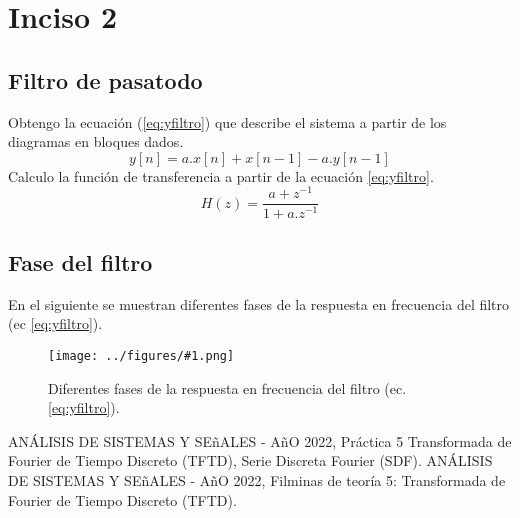 \documentclass[letterpaper, 10 pt, conference]{ieeeconf}  %
\newcommand{\image}[2] {
  \begin{figure}[H]
    \centering
    \texttt{[image: ../figures/\#1.png]}
    \caption{#2}
    \label{fig:#1}
  \end{figure}
}
\begin{document}
\section{Inciso 2}
\subsection{Filtro de pasatodo}
Obtengo la ecuación (\ref{eq:yfiltro}) que describe el sistema a partir de los diagramas en bloques dados.
\begin{equation} \label{eq:yfiltro}
  y[n] = a.x[n] + x[n-1] - a.y[n-1]
\end{equation}
Calculo la función de transferencia a partir de la ecuación \ref{eq:yfiltro}.
\begin{equation} \label{eq:Hfiltro}
  H(z) = \frac{a + z^{-1}}{1+a.z^{-1}}
\end{equation}
\subsection{Fase del filtro}
En el siguiente se muestran diferentes fases de la respuesta en frecuencia del filtro (ec \ref{eq:yfiltro}).
\image{HPhiA}{Diferentes fases de la respuesta en frecuencia del filtro (ec. \ref{eq:yfiltro}).}

\begin{thebibliography}{99}

ANÁLISIS DE SISTEMAS Y SE\~{n}ALES - A\~{n}O 2022, Práctica 5 Transformada de Fourier de Tiempo Discreto (TFTD), Serie Discreta Fourier (SDF).
ANÁLISIS DE SISTEMAS Y SE\~{n}ALES - A\~{n}O 2022, Filminas de teor\'ia 5: Transformada de Fourier de Tiempo Discreto (TFTD).

\end{thebibliography}
\end{document}
